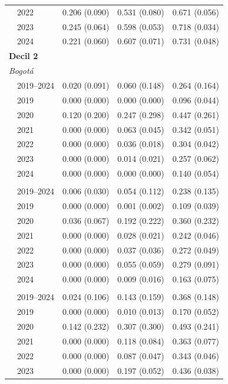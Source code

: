 \begin{table}[htbp]
\begin{tabular}{llrrr}
 & 2022 & 0.206 (0.090) & 0.531 (0.080) & 0.671 (0.056) \\
 & 2023 & 0.245 (0.064) & 0.598 (0.053) & 0.718 (0.034) \\
 & 2024 & 0.221 (0.060) & 0.607 (0.071) & 0.731 (0.048) \\
\midrule
\multicolumn{5}{l}{\textbf{Decil 2}} \\
\multicolumn{5}{l}{\textit{Bogotá}} \\
 & 2019–2024 & 0.020 (0.091) & 0.060 (0.148) & 0.264 (0.164) \\
 & 2019 & 0.000 (0.000) & 0.000 (0.000) & 0.096 (0.044) \\
 & 2020 & 0.120 (0.200) & 0.247 (0.298) & 0.447 (0.261) \\
 & 2021 & 0.000 (0.000) & 0.063 (0.045) & 0.342 (0.051) \\
 & 2022 & 0.000 (0.000) & 0.036 (0.018) & 0.304 (0.042) \\
 & 2023 & 0.000 (0.000) & 0.014 (0.021) & 0.257 (0.062) \\
 & 2024 & 0.000 (0.000) & 0.000 (0.000) & 0.140 (0.054) \\
\addlinespace[2pt]
\multicolumn{5}{l}{\textit{Medellín}} \\
 & 2019–2024 & 0.006 (0.030) & 0.054 (0.112) & 0.238 (0.135) \\
 & 2019 & 0.000 (0.000) & 0.001 (0.002) & 0.109 (0.039) \\
 & 2020 & 0.036 (0.067) & 0.192 (0.222) & 0.360 (0.232) \\
 & 2021 & 0.000 (0.000) & 0.028 (0.021) & 0.242 (0.046) \\
 & 2022 & 0.000 (0.000) & 0.037 (0.036) & 0.272 (0.049) \\
 & 2023 & 0.000 (0.000) & 0.055 (0.059) & 0.279 (0.091) \\
 & 2024 & 0.000 (0.000) & 0.009 (0.016) & 0.163 (0.075) \\
\addlinespace[2pt]
\multicolumn{5}{l}{\textit{Cali}} \\
 & 2019–2024 & 0.024 (0.106) & 0.143 (0.159) & 0.368 (0.148) \\
 & 2019 & 0.000 (0.000) & 0.010 (0.013) & 0.170 (0.052) \\
 & 2020 & 0.142 (0.232) & 0.307 (0.300) & 0.493 (0.241) \\
 & 2021 & 0.000 (0.000) & 0.118 (0.084) & 0.363 (0.077) \\
 & 2022 & 0.000 (0.000) & 0.087 (0.047) & 0.343 (0.046) \\
 & 2023 & 0.000 (0.000) & 0.197 (0.052) & 0.436 (0.038) \\

\end{tabular}
\end{table}
